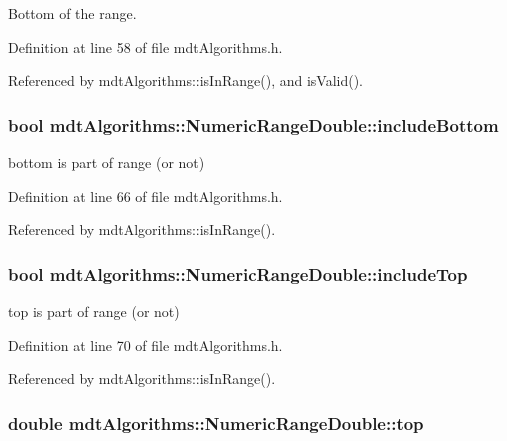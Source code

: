 Bottom of the range. 



Definition at line 58 of file mdt\-Algorithms.\-h.



Referenced by mdt\-Algorithms\-::is\-In\-Range(), and is\-Valid().

\hypertarget{structmdt_algorithms_1_1_numeric_range_double_a9984b8035c067b09372d6f72efe8a380}{
\subsubsection[{include\-Bottom}]{\setlength{\rightskip}{0pt plus 5cm}bool mdt\-Algorithms\-::\-Numeric\-Range\-Double\-::include\-Bottom}}\label{structmdt_algorithms_1_1_numeric_range_double_a9984b8035c067b09372d6f72efe8a380}


bottom is part of range (or not) 



Definition at line 66 of file mdt\-Algorithms.\-h.



Referenced by mdt\-Algorithms\-::is\-In\-Range().

\hypertarget{structmdt_algorithms_1_1_numeric_range_double_a1952d279de07fc5242defab4986a5fb3}{
\subsubsection[{include\-Top}]{\setlength{\rightskip}{0pt plus 5cm}bool mdt\-Algorithms\-::\-Numeric\-Range\-Double\-::include\-Top}}\label{structmdt_algorithms_1_1_numeric_range_double_a1952d279de07fc5242defab4986a5fb3}


top is part of range (or not) 



Definition at line 70 of file mdt\-Algorithms.\-h.



Referenced by mdt\-Algorithms\-::is\-In\-Range().

\hypertarget{structmdt_algorithms_1_1_numeric_range_double_a2a0da5ccbeee1a3f8a613b7e7655d326}{
\subsubsection[{top}]{\setlength{\rightskip}{0pt plus 5cm}double mdt\-Algorithms\-::\-Numeric\-Range\-Double\-::top}}\label{structmdt_algorithms_1_1_numeric_range_double_a2a0da5ccbeee1a3f8a613b7e7655d326}


